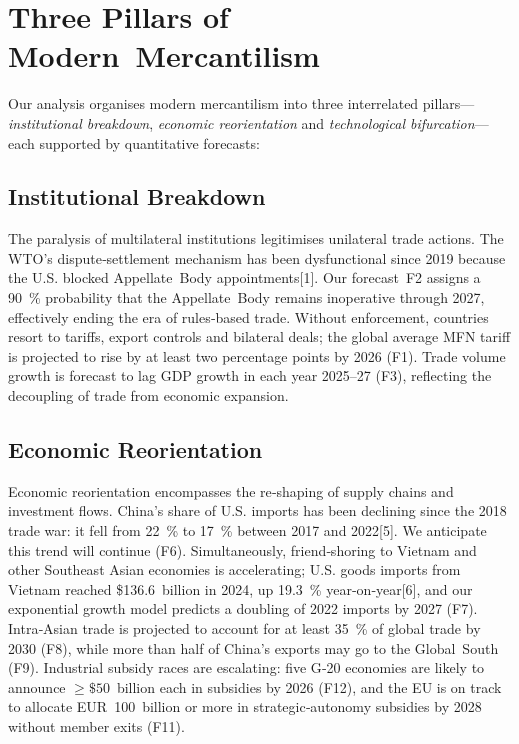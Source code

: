 \documentclass[12pt]{article}
\begin{document}
\section{Three Pillars of Modern Mercantilism}

Our analysis organises modern mercantilism into three interrelated pillars—\textit{institutional breakdown}, \textit{economic reorientation} and \textit{technological bifurcation}—each supported by quantitative forecasts:

\subsection{Institutional Breakdown}

The paralysis of multilateral institutions legitimises unilateral trade actions.  The WTO’s dispute‑settlement mechanism has been dysfunctional since 2019 because the U.S. blocked Appellate Body appointments[1].  Our forecast F2 assigns a 90 \% probability that the Appellate Body remains inoperative through 2027, effectively ending the era of rules‑based trade.  Without enforcement, countries resort to tariffs, export controls and bilateral deals; the global average MFN tariff is projected to rise by at least two percentage points by 2026 (F1).  Trade volume growth is forecast to lag GDP growth in each year 2025–27 (F3), reflecting the decoupling of trade from economic expansion.

\subsection{Economic Reorientation}

Economic reorientation encompasses the re‑shaping of supply chains and investment flows.  China’s share of U.S. imports has been declining since the 2018 trade war: it fell from 22 \% to 17 \% between 2017 and 2022[5].  We anticipate this trend will continue (F6).  Simultaneously, friend‑shoring to Vietnam and other Southeast Asian economies is accelerating; U.S. goods imports from Vietnam reached \$136.6 billion in 2024, up 19.3 \% year‑on‑year[6], and our exponential growth model predicts a doubling of 2022 imports by 2027 (F7).  Intra‑Asian trade is projected to account for at least 35 \% of global trade by 2030 (F8), while more than half of China’s exports may go to the Global South (F9).  Industrial subsidy races are escalating: five G‑20 economies are likely to announce \(\geq \$50\) billion each in subsidies by 2026 (F12), and the EU is on track to allocate EUR 100 billion or more in strategic‑autonomy subsidies by 2028 without member exits (F11).
\end{document}
